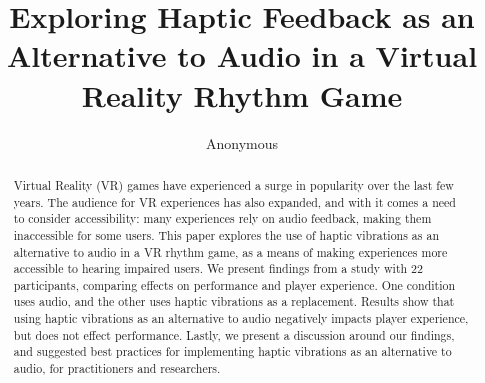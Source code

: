 \documentclass[manuscript,screen]{acmart}
\begin{document}
\title{Exploring Haptic Feedback as an Alternative to Audio in a Virtual Reality Rhythm Game}


\author{Anonymous}



\renewcommand{\shortauthors}{}

\begin{abstract}
Virtual Reality (VR) games have experienced a surge in popularity over the last few years. The audience for VR experiences has also expanded, and with it comes a need to consider accessibility: many experiences rely on audio feedback, making them inaccessible for some users. This paper explores the use of haptic vibrations as an alternative to audio in a VR rhythm game, as a means of making experiences more accessible to hearing impaired users. We present findings from a study with 22 participants, comparing effects on performance and player experience. One condition uses audio, and the other uses haptic vibrations as a replacement. Results show that using haptic vibrations as an alternative to audio negatively impacts player experience, but does not effect performance. Lastly, we present a discussion around our findings, and suggested best practices for implementing haptic vibrations as an alternative to audio, for practitioners and researchers.
\end{abstract}
\end{document}
